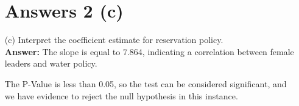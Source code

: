 \documentclass[12pt,letterpaper]{article}
\begin{document}
\begin{enumerate}
\newpage

\section*{Answers 2 (c)}

	\item [(c)] Interpret the coefficient estimate for reservation policy. \\
	
	\textbf{Answer:} The slope is equal to 7.864, indicating a correlation between female leaders and water policy. 
	
	The P-Value is less than 0.05, so the test can be considered significant, and we have evidence to reject the null hypothesis in this instance.
	
\end{enumerate}
\end{document}
